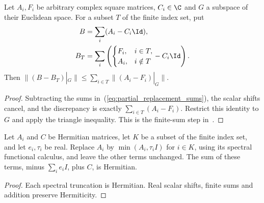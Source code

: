 \begin{theorem}
    \label{thm:partial_clipping_restricted_sum}
    \leanok
    Let $A_i,F_i$ be arbitrary complex square matrices, $C_i\in\C$ and
    $G$ a subspace of their Euclidean space. For a subset $T$ of the finite
    index set, put
    \begin{align}
        B   & =\sum_i(A_i-C_i\Id),\notag \\
        B_T & =\sum_i\left(
        \begin{cases}F_i,&i\in T,\\A_i,&i\notin T\end{cases}-C_i\Id\right).
        \label{eq:partial_replacement_sums}
    \end{align}
    Then $\|(B-B_T)|_G\|\le\sum_{i\in T}\|(A_i-F_i)|_G\|$.
\end{theorem}
\begin{proof}
    \leanok
    Subtracting the sums in~(\ref{eq:partial_replacement_sums}), the scalar
    shifts cancel, and the discrepancy is exactly
    $\sum_{i\in T}(A_i-F_i)$. Restrict this identity to $G$ and apply the
    triangle inequality. This is the finite-sum step
    in~\cite[lines 979--1005]{Arad2016RigorousRG}.
\end{proof}

\begin{lemma}
    \label{lem:centered_partial_truncation_hermitian}
    \leanok
    Let $A_i$ and $C$ be Hermitian matrices, let $K$ be a subset of the
    finite index set, and let $e_i,\tau_i$ be real. Replace $A_i$ by
    $\min(A_i,\tau_i I)$ for $i\in K$, using its spectral functional
    calculus, and leave the other terms unchanged. The sum of these
    terms, minus $\sum_i e_i I$, plus $C$, is Hermitian.
\end{lemma}
\begin{proof}\leanok
    Each spectral truncation is Hermitian. Real scalar shifts,
    finite sums and addition preserve Hermiticity.
\end{proof}
